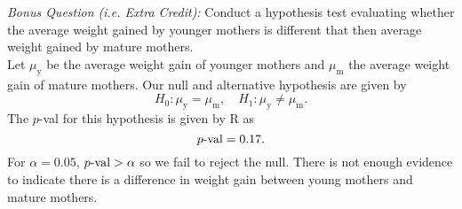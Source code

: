 \documentclass[a4paper, 12pt]{../../config/homework}
\begin{document}
\vspace{2\singlelineheight} \noindent
\textit{Bonus Question (i.e. Extra Credit):} Conduct a hypothesis test evaluating whether the average weight gained by younger mothers is different that then average weight gained by mature mothers.
\\Let $\mu_\text{y}$ be the average weight gain of younger mothers and $\mu_\text{m}$ the average weight gain of mature mothers. Our null and alternative hypothesis are given by
\[H_0:\mu_\text{y} = \mu_\text{m}, \quad H_1 : \mu_\text{y} \ne \mu_\text{m}.\]
The $p$-val for this hypothesis is given by R as
\[\text{$p$-val} = 0.17.\]
For $\alpha = 0.05$, $\text{$p$-val} > \alpha$ so we fail to reject the null. There is not enough evidence to indicate there is a difference in weight gain between young mothers and mature mothers.
\end{document}
